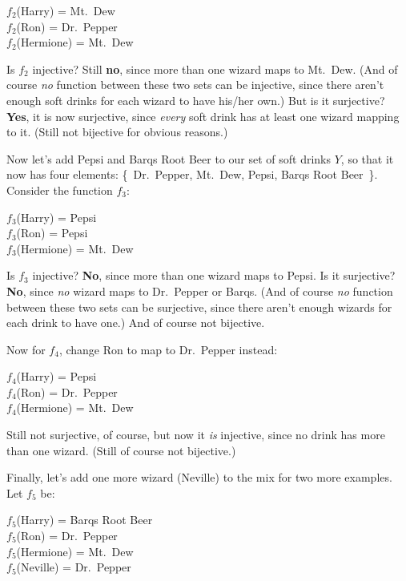 \begin{center}
$f_2$(Harry) = Mt.~Dew \\
$f_2$(Ron) = Dr.~Pepper \\
$f_2$(Hermione) = Mt.~Dew
\end{center}

Is $f_2$ injective? Still \textbf{no}, since more than one wizard maps to
Mt.~Dew. (And of course \textit{no} function between these two sets can be
injective, since there aren't enough soft drinks for each wizard to have
his/her own.) But is it surjective?  \textbf{Yes}, it is now surjective, since
\textit{every} soft drink has at least one wizard mapping to it. (Still not
bijective for obvious reasons.)

Now let's add Pepsi and Barqs Root Beer to our set
of soft drinks $Y$, so that it now has four elements: \{~Dr.~Pepper,
Mt.~Dew, Pepsi, Barqs Root Beer~\}. Consider the function $f_3$:

\begin{center}
$f_3$(Harry) = Pepsi \\
$f_3$(Ron) = Pepsi \\
$f_3$(Hermione) = Mt.~Dew
\end{center}

Is $f_3$ injective? \textbf{No}, since more than one wizard maps to
Pepsi. Is it surjective? \textbf{No}, since \textit{no} wizard maps to
Dr.~Pepper or Barqs. (And of course \textit{no} function between these two
sets can be surjective, since there aren't enough wizards for each drink to
have one.) And of course not bijective.

Now for $f_4$, change Ron to map to Dr.~Pepper instead:

\begin{center}
$f_4$(Harry) = Pepsi \\
$f_4$(Ron) = Dr.~Pepper \\
$f_4$(Hermione) = Mt.~Dew
\end{center}

Still not surjective, of course, but now it \textit{is} injective, since
no drink has more than one wizard. (Still of course not bijective.)

Finally, let's add one more wizard (Neville) to the mix for two more
examples. Let $f_5$ be:

\begin{center}
$f_5$(Harry) = Barqs Root Beer \\
$f_5$(Ron) = Dr.~Pepper \\
$f_5$(Hermione) = Mt.~Dew \\
$f_5$(Neville) = Dr.~Pepper
\end{center}


